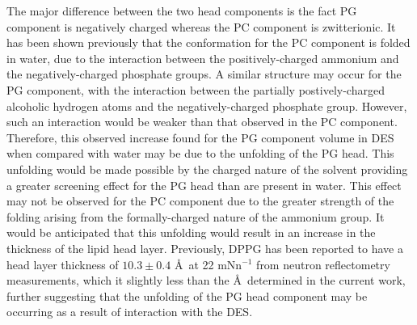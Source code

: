 \documentclass[twoside,twocolumn,9pt]{article}
\begin{document}
The major difference between the two head components is the fact PG component is negatively charged whereas the PC component is zwitterionic. It has been shown previously that the conformation for the PC component is folded in water,\cite{Gilliams2016} due to the interaction between the positively-charged ammonium and the negatively-charged phosphate groups. A similar structure may occur for the PG component, with the interaction between the partially postively-charged alcoholic hydrogen atoms and the negatively-charged phosphate group. However, such an interaction would be weaker than that observed in the PC component. Therefore, this observed increase found for the PG component volume in DES when compared with water may be due to the unfolding of the PG head. This unfolding would be made possible by the charged nature of the solvent providing a greater screening effect for the PG head than are present in water. This effect may not be observed for the PC component due to the greater strength of the folding arising from the formally-charged nature of the ammonium group. It would be anticipated that this unfolding would result in an increase in the thickness of the lipid head layer. Previously, DPPG has been reported to have a head layer thickness of $10.3\pm0.4$ \AA\ at 22 mNn$^{-1}$ from neutron reflectometry measurements,\cite{Clifton2012} which it slightly less than the  \AA\ determined in the current work, further suggesting that the unfolding of the PG head component may be occurring as a result of interaction with the DES.
\end{document}
